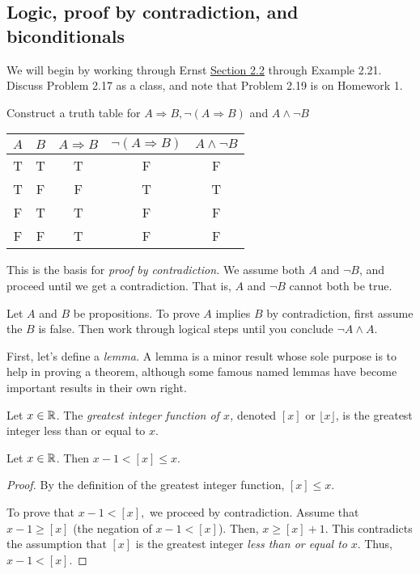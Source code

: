 \documentclass{ximera}
\begin{document}
\subsection{Logic, proof by contradiction, and biconditionals}%

We will begin by working through Ernst \href{https://danaernst.com/IBL-IntroToProof/pretext/sec_Intro_to_Logic.html}{Section 2.2} through Example 2.21. Discuss Problem 2.17 as a class, and note that Problem 2.19 is on Homework 1.



\begin{br}
 Construct a truth table for $A\Rightarrow B, \neg (A\Rightarrow B)$ and $A\land \neg B$
\end{br}
\begin{solution}
 
\begin{tabular}{c|c|c|c|c}
 $A$ 	& $B$	& $A\Rightarrow B$ 	& $\neg (A\Rightarrow B)$ & $A\land \neg B$\\\hline
  T 	& T		& T 				& F					& F	\\
  T 	& F 		& F 				& T					& T\\
  F 	& T 		& T 				& F					& F\\
  F 	& F 		& T 				& F					& F\\
\end{tabular}
\end{solution}

This is the basis for \emph{proof by contradiction.} We assume both $A$ and $\neg B$, and proceed until we get a contradiction. That is, $A$ and $\neg B$ cannot both be true.

\begin{defn}
 Let $A$ and $B$ be propositions. To prove $A$ implies $B$ by contradiction, first assume the $B$ is false. Then work through logical steps until you conclude $\neg A \land A$.
\end{defn}

First, let's define a \emph{lemma.} A lemma is a minor result whose sole purpose is to help in proving a theorem, although some famous named lemmas have become important results in their own right.

\begin{defn}
 Let $x\in\mathbb R$. The \emph{greatest integer function of $x$,} denoted $[x]$ or $\lfloor x \rfloor$, is the greatest integer less than or equal to $x$.
\end{defn}
\begin{lem}\label{lem-floor-range}
 Let $x\in\mathbb R$. Then $x-1<[x]\leq x$.
\end{lem}
\begin{proof}
By the definition of the greatest integer function, $[x]\leq x$. 

To prove that $x-1<[x],$ we proceed by contradiction. Assume that $x-1\geq [x]$ (the negation of $x-1<[x]$). Then, $x\geq [x]+1$. This contradicts the assumption that $[x]$ is the greatest integer \emph{less than or equal to} $x$. Thus, $x-1<[x].$
\end{proof}
\end{document}
